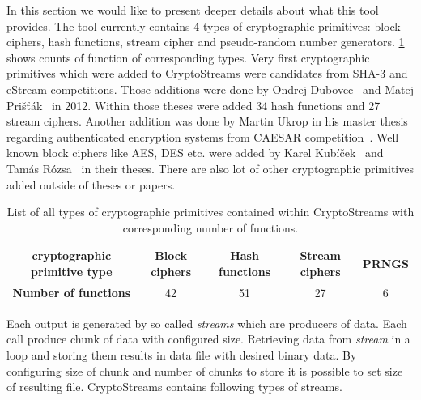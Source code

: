 \documentclass[
    digital,    %
    oneside,    %
    color,
    11pt,
    nocover,
    notable,
    nolof,
    nolot,
    final
]{fithesis3}
\begin{document}
In this section we would like to present deeper details about what this tool provides. The tool currently contains 4 types of cryptographic primitives: block ciphers, hash functions, stream cipher and pseudo-random number generators. \cref{table:all-cryptoprimitives}  shows counts of function of corresponding types. Very first cryptographic primitives which were added to CryptoStreams were candidates from SHA-3 and eStream competitions. Those additions were done by Ondrej Dubovec~\cite{Dubovec2012thesis} and Matej Prišťák~\cite{Pristak2012thesis} in 2012. Within those theses were added 34 hash functions and 27 stream ciphers. Another addition was done by Martin Ukrop in his master thesis~\cite{Ukrop2016thesis} regarding authenticated encryption systems from CAESAR competition~\cite{caesar-competition}. Well known block ciphers like AES, DES etc. were added by Karel Kubíček~\cite{Kubicek2017thesis} and Tamás Rózsa~\cite{Rozsa2018thesis} in their theses. There are also lot of other cryptographic primitives added outside of theses or papers.

\begin{table}[t]
	\centering	
	\begin{tabular}{c|c c c c}
		\textbf{\large cryptographic primitive type} &  Block ciphers &  Hash functions &  Stream ciphers &  PRNGS  \\ \hline
		\textbf{\large Number of functions} & 42	&	51		&		27	&		6	\\
		
	\end{tabular}
	\caption{List of all types of cryptographic primitives contained within CryptoStreams with corresponding number of functions.}
	\label{table:all-cryptoprimitives}
\end{table}

Each output is generated by so called \textit{streams} which are producers of data. Each call produce chunk of data with configured size. Retrieving data from \textit{stream} in a loop and storing them results in data file with desired binary data. By configuring size of chunk and number of chunks to store it is possible to set size of resulting file. CryptoStreams contains following types of streams.
\end{document}
